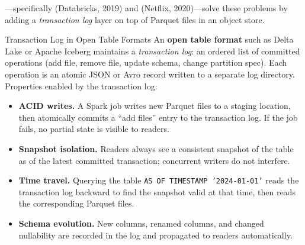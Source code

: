 ---specifically  (Databricks,
2019) and  (Netflix, 2020)---solve these
problems by adding a \emph{transaction log} layer on top of Parquet
files in an object store.

\begin{defbox}{Transaction Log in Open Table Formats}
An \textbf{open table format} such as Delta Lake or Apache Iceberg
maintains a \emph{transaction log}: an ordered list of committed
operations (add file, remove file, update schema, change partition
spec). Each operation is an atomic JSON or Avro record written to a
separate log directory. Properties enabled by the transaction log:
\begin{itemize}
  \item \textbf{ACID writes.} A Spark job writes new Parquet files to
        a staging location, then atomically commits a ``add files''
        entry to the transaction log. If the job fails, no partial
        state is visible to readers.
  \item \textbf{Snapshot isolation.} Readers always see a consistent
        snapshot of the table as of the latest committed transaction;
        concurrent writers do not interfere.
  \item \textbf{Time travel.} Querying the table \texttt{AS OF TIMESTAMP
        '2024-01-01'} reads the transaction log backward to find the
        snapshot valid at that time, then reads the corresponding
        Parquet files.
  \item \textbf{Schema evolution.} New columns, renamed columns, and
        changed nullability are recorded in the log and propagated to
        readers automatically.
\end{itemize}
\end{defbox}


